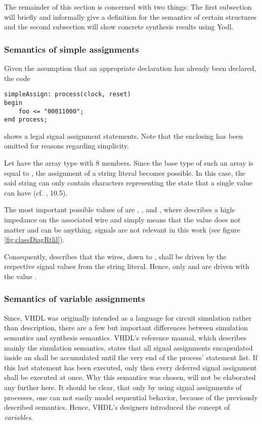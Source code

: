 The remainder of this section is concerned with two things: The first
subsection will briefly and informally give a definition for the
semantics of certain structures and the second subsection will
show concrete synthesis results using Yodl.

\subsubsection{Semantics of simple assignments}

Given the assumption that an appropriate  declaration has
already been declared, the code
%
\begin{lstlisting}[style=vhdl]
simpleAssign: process(clock, reset)
begin
    foo <= "00011000";
end process;
\end{lstlisting}
%
shows a legal signal assignment statements. Note that the
enclosing  has been omitted for reasons regarding
simplicity.

Let  have the array type  with 8
members. Since the base type of such an array is equal to
, the assignment of a string literal becomes
possible. In this case, the said string can only contain characters
representing the state that a single  value can have
(cf. \cite{IEEELRM}, 10.5).

The most important possible values of  are ,
,  and , where  describes a
high-impedance on the associated wire and  simply means that
the value does not matter and can be anything.  signals are
not relevant in this work (see figure \ref{fig:classDiagRtlil}).

Consequently,  describes that the wires,
 down to , shall be driven by the respective
signal values from the string literal. Hence, only  and
 are driven with the value .

\subsubsection{Semantics of variable assignments}

Since, VHDL was originally intended as a language for circuit
simulation rather than description, there are a few but important
differences between simulation semantics and synthesis
semantics. VHDL's reference manual, which describes mainly the
simulation semantics, states that all signal assignments encapsulated
inside an  shall be accumulated until the very end of the
process' statement list. If this last statement has been executed,
only then every deferred signal assignment shall be executed at once.
Why this semantics was chosen, will not be elaborated any further
here. It should be clear, that only by using signal assignments
of processes, one can not easily model sequential behavior, because
of the previously described semantics. Hence, VHDL's designers
introduced the concept of \emph{variables}.

